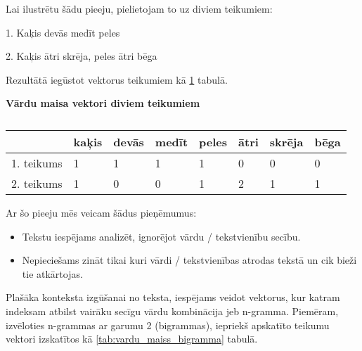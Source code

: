 Lai ilustrētu šādu pieeju, pielietojam to uz diviem teikumiem:

1. Kaķis devās medīt peles

2. Kaķis ātri skrēja, peles ātri bēga

Rezultātā iegūstot vektorus teikumiem kā \ref{tab:vardu_maiss} tabulā.
\begin{table}[H]
\centering
\caption{\label{tab:vardu_maiss}}
\textbf{Vārdu maisa vektori diviem teikumiem\\}
\begin{tabular}{|l|l|l|l|l|l|l|l|}
\hline
           & kaķis & devās & medīt & peles & ātri & skrēja & bēga \\ \hline
1. teikums & 1     & 1     & 1     & 1     & 0    & 0      & 0    \\ \hline
2. teikums & 1     & 0     & 0     & 1     & 2    & 1      & 1    \\ \hline
\end{tabular}
\end{table}

Ar šo pieeju mēs veicam šādus pieņēmumus:
\begin{itemize}
\item Tekstu iespējams analizēt, ignorējot vārdu / tekstvienību secību.
\item Nepieciešams zināt tikai kuri vārdi / tekstvienības atrodas tekstā un cik bieži tie atkārtojas.
\end{itemize}

Plašāka konteksta izgūšanai no teksta, iespējams veidot vektorus, kur katram indeksam atbilst vairāku secīgu vārdu kombinācija jeb n-gramma. Piemēram, izvēloties n-grammas ar garumu 2 (bigrammas), iepriekš apskatīto teikumu vektori izskatītos kā \ref{tab:vardu_maiss_bigramma} tabulā.

